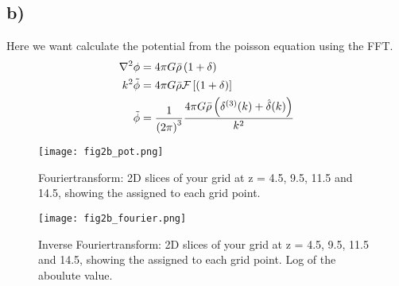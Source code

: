 \subsection{b)}
Here we want calculate the potential from the poisson equation using the FFT. 
\begin{align}
    \nabla^2\phi &= 4 \pi G \Bar{\rho} \left({1+ \delta}\right)\\
    k^2 \Tilde{\phi} &= 4\pi G \Bar{\rho} \mathcal{F}\left[\left({1+\delta}\right)\right] \\
     \Tilde{\phi} &= \frac{1}{\left({2 \pi}\right)^3}\frac{4\pi G \Bar{\rho} \left({\delta^{(3)}(k) + \hat{\delta}(k)}\right)}{k^2}
\end{align}


\begin{figure}[h!]
    \centering
    \texttt{[image: fig2b\_pot.png]}
    \caption{Fouriertransform: 2D slices of your grid at z = 4.5, 9.5, 11.5 and
    14.5, showing the assigned to each grid point.}
\end{figure}


\begin{figure}[h!]
    \centering
    \texttt{[image: fig2b\_fourier.png]}
    \caption{Inverse Fouriertransform: 2D slices of your grid at z = 4.5, 9.5, 11.5 and
    14.5, showing the assigned to each grid point. Log of the aboulute value.}
\end{figure}





